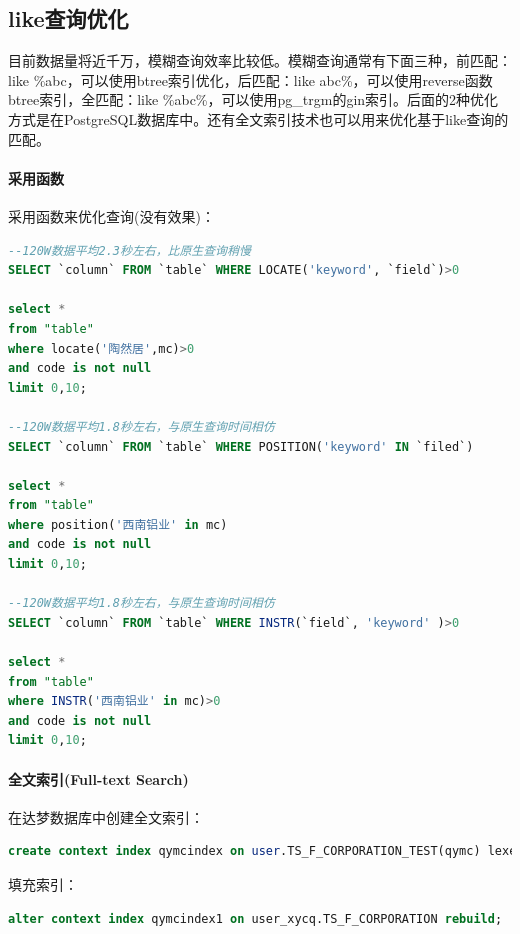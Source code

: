 \documentclass[letter]{book}
\begin{document}
\subsection{like查询优化}

目前数据量将近千万，模糊查询效率比较低。模糊查询通常有下面三种，前匹配：like \%abc，可以使用btree索引优化，后匹配：like abc\%，可以使用reverse函数btree索引，全匹配：like \%abc\%，可以使用pg\_trgm的gin索引。后面的2种优化方式是在PostgreSQL数据库中。还有全文索引技术也可以用来优化基于like查询的匹配。

\paragraph{采用函数}

采用函数来优化查询(没有效果)：

\begin{lstlisting}[language=SQL]
--120W数据平均2.3秒左右，比原生查询稍慢
SELECT `column` FROM `table` WHERE LOCATE('keyword', `field`)>0

select * 
from "table" 
where locate('陶然居',mc)>0
and code is not null
limit 0,10;

--120W数据平均1.8秒左右，与原生查询时间相仿
SELECT `column` FROM `table` WHERE POSITION('keyword' IN `filed`)

select * 
from "table" 
where position('西南铝业' in mc)
and code is not null
limit 0,10;

--120W数据平均1.8秒左右，与原生查询时间相仿
SELECT `column` FROM `table` WHERE INSTR(`field`, 'keyword' )>0

select * 
from "table" 
where INSTR('西南铝业' in mc)>0
and code is not null
limit 0,10;
\end{lstlisting}

\paragraph{全文索引(Full-text Search)}

在达梦数据库中创建全文索引：

\begin{lstlisting}[language=SQL]
create context index qymcindex on user.TS_F_CORPORATION_TEST(qymc) lexer CHINESE_VGRAM_LEXER;
\end{lstlisting}

填充索引：

\begin{lstlisting}[language=SQL]
alter context index qymcindex1 on user_xycq.TS_F_CORPORATION rebuild;
\end{lstlisting}
\end{document}
